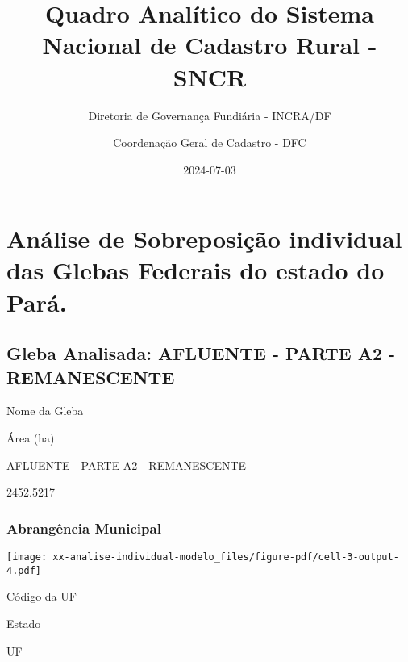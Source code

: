 \documentclass[
  11pt,
  a4paper,
  DIV=11,
  numbers=noendperiod]{scrartcl}
\title{Quadro Analítico do Sistema Nacional de Cadastro Rural - SNCR}
\subtitle{Diretoria de Governança Fundiária - INCRA/DF}
\author{Coordenação Geral de Cadastro - DFC}
\date{2024-07-03}
\begin{document}
\maketitle

\section{Análise de Sobreposição individual das Glebas Federais do
estado do
Pará.}\label{anuxe1lise-de-sobreposiuxe7uxe3o-individual-das-glebas-federais-do-estado-do-paruxe1.}

\subsection{Gleba Analisada: AFLUENTE - PARTE A2 -
REMANESCENTE}\label{gleba-analisada-afluente---parte-a2---remanescente}

\n  

\n    

\n      

Nome da Gleba

\n      

Área (ha)

\n    

\n  

\n  

\n    

\n      

AFLUENTE - PARTE A2 - REMANESCENTE

\n      

2452.5217

\n    

\n  

\n

\subsubsection{Abrangência Municipal}\label{abranguxeancia-municipal}

\texttt{[image: xx-analise-individual-modelo\_files/figure-pdf/cell-3-output-4.pdf]}

\n  

\n    

\n      

Código da UF

\n      

Estado

\n      

UF

\n      
\end{document}
